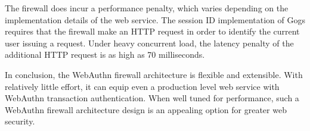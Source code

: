The firewall does incur a performance penalty, which varies depending on the implementation details of the web service. The session ID implementation of Gogs requires that the firewall make an HTTP request in order to identify the current user issuing a request. Under heavy concurrent load, the latency penalty of the additional HTTP request is as high as 70 milliseconds.

In conclusion, the WebAuthn firewall architecture is flexible and extensible. With relatively little effort, it can equip even a production level web service with WebAuthn transaction authentication. When well tuned for performance, such a WebAuthn firewall architecture design is an appealing option for greater web security.




